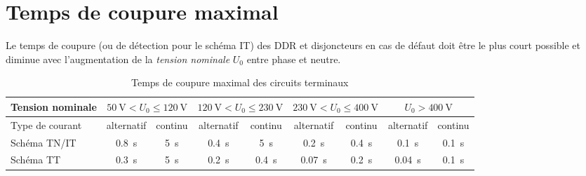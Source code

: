 \section{Temps de coupure maximal\label{tab:temps_coupure_DDR}}

Le temps de coupure (ou de détection pour le schéma IT) des DDR et disjoncteurs en cas de défaut doit être le plus court possible et diminue avec l'augmentation de la \emph{tension nominale} $U_0$ entre phase et neutre.

\begin{table}[H]
\caption{Temps de coupure maximal des circuits terminaux}
\begin{tabularx}{\linewidth}{X cccccccc}
\toprule
Tension nominale		& \multicolumn{2}{c}{$\SI{50}{\volt}<U_0\leq\SI{120}{\volt}$} 	& \multicolumn{2}{c}{$\SI{120}{\volt}<U_0\leq\SI{230}{\volt}$} & \multicolumn{2}{c}{$\SI{230}{\volt}<U_0\leq\SI{400}{\volt}$}		& \multicolumn{2}{c}{$U_0>\SI{400}{\volt}$}\\
\midrule
Type de courant		& alternatif	& continu	& alternatif	& continu	& alternatif	& continu	& alternatif	& continu \\
\addlinespace
Schéma TN/IT	& \SI{0,8}{\second}	&	\SI{5}{\second}	&	\SI{0,4}{\second}	&	\SI{5}{\second}	&	\SI{0,2}{\second}	&	\SI{0,4}{\second}	&	\SI{0,1}{\second}	&	\SI{0,1}{\second} \\	
\addlinespace
Schéma TT	& \SI{0,3}{\second}	&	\SI{5}{\second}	&	\SI{0,2}{\second}	&	\SI{0,4}{\second}	&	\SI{0,07}{\second}	&	\SI{0,2}{\second}	&	\SI{0,04}{\second}	&	\SI{0,1}{\second} \\	
\bottomrule
\end{tabularx}
\end{table}

%

